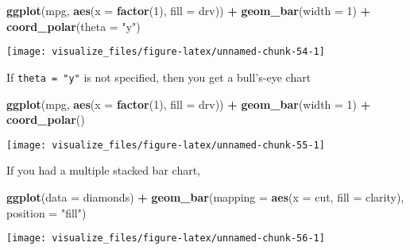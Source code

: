 \documentclass[]{book}
\newenvironment{Shaded}{\begin{snugshade}}{\end{snugshade}}
\newcommand{\DataTypeTok}[1]{\textcolor[rgb]{0.13,0.29,0.53}{#1}}
\newcommand{\DecValTok}[1]{\textcolor[rgb]{0.00,0.00,0.81}{#1}}
\newcommand{\KeywordTok}[1]{\textcolor[rgb]{0.13,0.29,0.53}{\textbf{#1}}}
\newcommand{\NormalTok}[1]{#1}
\newcommand{\OperatorTok}[1]{\textcolor[rgb]{0.81,0.36,0.00}{\textbf{#1}}}
\newcommand{\StringTok}[1]{\textcolor[rgb]{0.31,0.60,0.02}{#1}}
\theoremstyle{plain}
\theoremstyle{remark}
\begin{document}
\begin{Shaded}
\begin{Highlighting}[]
\KeywordTok{ggplot}\NormalTok{(mpg, }\KeywordTok{aes}\NormalTok{(}\DataTypeTok{x =} \KeywordTok{factor}\NormalTok{(}\DecValTok{1}\NormalTok{), }\DataTypeTok{fill =}\NormalTok{ drv)) }\OperatorTok{+}
\StringTok{  }\KeywordTok{geom_bar}\NormalTok{(}\DataTypeTok{width =} \DecValTok{1}\NormalTok{) }\OperatorTok{+}
\StringTok{  }\KeywordTok{coord_polar}\NormalTok{(}\DataTypeTok{theta =} \StringTok{"y"}\NormalTok{)}
\end{Highlighting}
\end{Shaded}

\begin{center}\texttt{[image: visualize\_files/figure-latex/unnamed-chunk-54-1]} \end{center}

If \texttt{theta\ =\ "y"} is not specified, then you get a bull's-eye
chart

\begin{Shaded}
\begin{Highlighting}[]
\KeywordTok{ggplot}\NormalTok{(mpg, }\KeywordTok{aes}\NormalTok{(}\DataTypeTok{x =} \KeywordTok{factor}\NormalTok{(}\DecValTok{1}\NormalTok{), }\DataTypeTok{fill =}\NormalTok{ drv)) }\OperatorTok{+}
\StringTok{  }\KeywordTok{geom_bar}\NormalTok{(}\DataTypeTok{width =} \DecValTok{1}\NormalTok{) }\OperatorTok{+}
\StringTok{  }\KeywordTok{coord_polar}\NormalTok{()}
\end{Highlighting}
\end{Shaded}

\begin{center}\texttt{[image: visualize\_files/figure-latex/unnamed-chunk-55-1]} \end{center}

If you had a multiple stacked bar chart,

\begin{Shaded}
\begin{Highlighting}[]
\KeywordTok{ggplot}\NormalTok{(}\DataTypeTok{data =}\NormalTok{ diamonds) }\OperatorTok{+}
\StringTok{  }\KeywordTok{geom_bar}\NormalTok{(}\DataTypeTok{mapping =} \KeywordTok{aes}\NormalTok{(}\DataTypeTok{x =}\NormalTok{ cut, }\DataTypeTok{fill =}\NormalTok{ clarity), }\DataTypeTok{position =} \StringTok{"fill"}\NormalTok{)}
\end{Highlighting}
\end{Shaded}

\begin{center}\texttt{[image: visualize\_files/figure-latex/unnamed-chunk-56-1]} \end{center}
\end{document}

